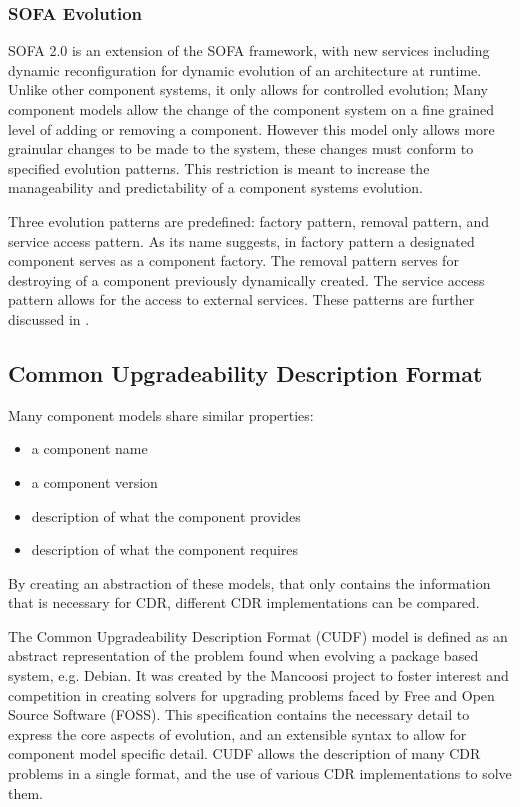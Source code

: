 \subsubsection{SOFA Evolution}
SOFA 2.0 is an extension of the SOFA framework, with new services including dynamic reconfiguration for dynamic evolution of an architecture at runtime. 
Unlike other component systems,
it only allows for controlled evolution; 
Many component models allow the change of the component system on a fine grained level of adding or removing a component.
However this model only allows more grainular changes to be made to the system, these changes must conform to specified evolution patterns.
This restriction is meant to increase the manageability and predictability of a component systems evolution. 

Three evolution patterns are predefined: factory pattern, removal pattern, and service access pattern.
As its name suggests, in factory pattern a designated component serves as a component factory. 
The removal pattern serves for destroying of a component previously dynamically created.
The service access pattern allows for the access to external services.
These patterns are further discussed in \cite{Hnetynka2006}.


\subsection{Common Upgradeability Description Format}
Many component models share similar properties:
\begin{itemize}
  \item a component name
  \item a component version
  \item description of what the component provides
  \item description of what the component requires
\end{itemize} 

By creating an abstraction of these models, that only contains the information that is necessary for CDR, different CDR implementations can be compared.

The Common Upgradeability Description Format (CUDF) model is defined as an abstract representation of the problem found when evolving a package based system, e.g. Debian.
It was created by the Mancoosi project to foster interest and competition in creating solvers for upgrading problems faced by Free and Open Source Software (FOSS).
This specification contains the necessary detail to express the core aspects of evolution, and an extensible syntax to allow for component model specific detail. 
CUDF allows the description of many CDR problems in a single format, and the use of various CDR implementations to solve them. 

